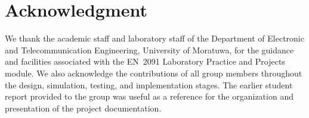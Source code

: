 \documentclass[11pt,a4paper]{article}
\begin{document}
\section*{Acknowledgment}
We thank the academic staff and laboratory staff of the Department of Electronic and Telecommunication Engineering, University of Moratuwa, for the guidance and facilities associated with the EN~2091 Laboratory Practice and Projects module. We also acknowledge the contributions of all group members throughout the design, simulation, testing, and implementation stages. The earlier student report provided to the group was useful as a reference for the organization and presentation of the project documentation.
\end{document}

